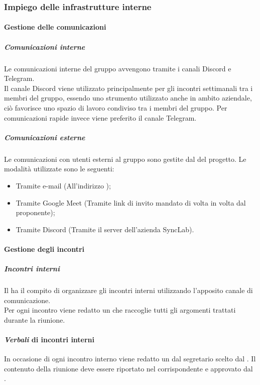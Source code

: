 \subsubsection{Impiego delle infrastrutture interne} \label{subsection:infrastrutture_interne}

\paragraph{Gestione delle comunicazioni}
\subparagraph{Comunicazioni interne}
Le comunicazioni interne del gruppo \groupName{} avvengono tramite i canali Discord\glo{} e Telegram\glo{}.\\
Il canale Discord\glo{} viene utilizzato principalmente per gli incontri settimanali tra i membri del gruppo, essendo uno strumento utilizzato anche in ambito aziendale, ciò favorisce uno spazio di lavoro condiviso tra i membri del gruppo.
Per comunicazioni rapide invece viene preferito il canale Telegram\glo{}.

\subparagraph{Comunicazioni esterne}
Le comunicazioni con utenti esterni al gruppo sono gestite dal \roleProjectManagerLow{} del progetto. Le modalità utilizzate sono le seguenti:
\begin {itemize}
\item Tramite e-mail (All'indirizzo \groupEmail{});
\item Tramite Google Meet\glo{} (Tramite link di invito mandato di volta in volta dal proponente);
\item Tramite Discord\glo{} (Tramite il server dell'azienda SyncLab).
\end {itemize}

\paragraph{Gestione degli incontri}
\subparagraph{Incontri interni}
Il \roleProjectManagerLow{} ha il compito di organizzare gli incontri interni utilizzando l'apposito canale di comunicazione.\\
Per ogni incontro viene redatto un \docNameVLow{} che raccoglie tutti gli argomenti trattati durante la riunione.
\paragraph {\textit{Verbali} di incontri interni}
In occasione di ogni incontro interno viene redatto un \docNameVLow{} dal segretario scelto dal \roleProjectManagerLow{}. Il contenuto della riunione deve essere riportato nel \docNameVLow{} corrispondente e approvato dal \roleProjectManagerLow{}.

